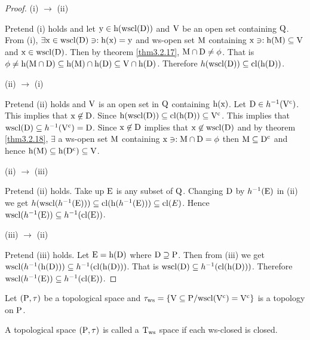 \begin{proof}
(i) $\to$ (ii)

Pretend (i) holds and let $\mathrm{y}\in \mathrm{h}(\mathrm{wscl}(\mathrm{D}))$ and $\mathrm{V}$ be an open set containing $\mathrm{Q}$. From (i), $\exists \mathrm{x} \in \mathrm{wscl}(\mathrm{D}) \ni: \mathrm{h}(\mathrm{x})=\mathrm{y}$ and ws-open set $\mathrm{M}$ containing $\mathrm{x} \ni: \mathrm{h}(\mathrm{M}) \subseteq \mathrm{V}$ and $\mathrm{x} \in\mathrm{wscl}(\mathrm{D})$. Then by theorem \ref{thm3.2.17}, $\mathrm{M}\cap \mathrm{D}\neq \phi$. That is $\phi \neq \mathrm{h}(\mathrm{M}\cap \mathrm{D}) \subseteq \mathrm{h}(\mathrm{M}) \cap \mathrm{h}(\mathrm{D}) \subseteq \mathrm{V}\cap \mathrm{h}(\mathrm{D})$. Therefore $h(\mathrm{wscl}(\mathrm{D}))\subseteq \mathrm{cl}(\mathrm{h}(\mathrm{D}))$.

(ii) $\to$ (i)

Pretend (ii) holds and $\mathrm{V}$ is an open set in $\mathrm{Q}$ containing $\mathrm{h}(\mathrm{x})$. Let $\mathrm{D}\in h^{-1} (\mathrm{V}^{\text{c}})$. This implies that $\mathrm{x}\not\in \mathrm{D}$. Since $\mathrm{h}(\mathrm{wscl}(\mathrm{D}))\subseteq \mathrm{cl}(\mathrm{h}(\mathrm{D})) \subseteq \mathrm{V}^{\text{c}}$. This implies that $\mathrm{wscl}(\mathrm{D}) \subseteq  h^{-1} (\mathrm{V}^{\text{c}})=\mathrm{D}$. Since $\mathrm{x}\not\in \mathrm{D}$ implies that $\mathrm{x}\not\in \mathrm{wscl}(\mathrm{D})$ and by theorem \ref{thm3.2.18}, $\exists$ a ws-open set $\mathrm{M}$ containing $\mathrm{x} \ni: \mathrm{M}\cap \mathrm{D} = \phi$ then $\mathrm{M}\subseteq \mathrm{D}^{\text{c}}$ and hence $\mathrm{h}(\mathrm{M}) \subseteq \mathrm{h}(\mathrm{D}^{\text{c}}) \subseteq \mathrm{V}$.

(ii) $\to$ (iii)

Pretend (ii) holds. Take up $\mathrm{E}$ is any subset of $\mathrm{Q}$. Changing $\mathrm{D}$ by $h^{-1}(\mathrm{E})$ in (ii) we get $h(\mathrm{wscl}(h^{-1}(\mathrm{E})))\subseteq \mathrm{cl}(\mathrm{h}(h^{-1}(\mathrm{E}))) \subseteq \mathrm{cl}(E)$. Hence $\mathrm{wscl}(h^{-1} (\mathrm{E})) \subseteq  h^{-1}(\mathrm{cl}(\mathrm{E}))$.

(iii) $\to$ (ii)

Pretend (iii) holds. Let $\mathrm{E}=\mathrm{h}(\mathrm{D})$ where $\mathrm{D}\supseteq \mathrm{P}$. Then from (iii) we get $\mathrm{wscl}(h^{-1} (\mathrm{h}(\mathrm{D}))) \subseteq  h^{-1} (\mathrm{cl}(\mathrm{h}(\mathrm{D})))$. That is $\mathrm{wscl}(\mathrm{D}) \subseteq  h^{-1} (\mathrm{cl}(\mathrm{h}(\mathrm{D})))$. Therefore $\mathrm{wscl}(h^{-1}(\mathrm{E})) \subseteq  h^{-1} (\mathrm{cl}(\mathrm{E}))$.
\end{proof}

\begin{dfn}\label{defi3.2.20}
Let $(\mathrm{P}, \tau)$ be a topological space and $\tau_{\text{ws}} =\{\mathrm{V}\subseteq \mathrm{P} / \mathrm{wscl}(\mathrm{V}^{\text{c}})=\mathrm{V}^{\text{c}}\}$ is a topology on $\mathrm{P}$.
\end{dfn}

\begin{dfn}\label{defi3.2.21}
A topological space $(\mathrm{P},\tau)$ is called a $\mathrm{T}_{\text{ws}}$ space if each ws-closed is closed.
\end{dfn}

